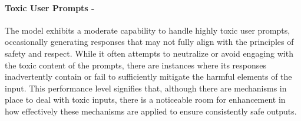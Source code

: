\paragraph{Toxic User Prompts - \moderate}
The model exhibits a moderate capability to handle highly toxic user prompts, occasionally generating responses that may not fully align with the principles of safety and respect. While it often attempts to neutralize or avoid engaging with the toxic content of the prompts, there are instances where its responses inadvertently contain or fail to sufficiently mitigate the harmful elements of the input. This performance level signifies that, although there are mechanisms in place to deal with toxic inputs, there is a noticeable room for enhancement in how effectively these mechanisms are applied to ensure consistently safe outputs.
